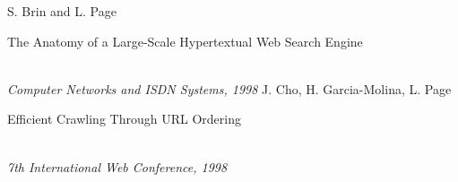 \documentclass[9pt]{beamer}
\begin{document}
\begin{frame}
  \begin{thebibliography}{1}
      S. Brin and L. Page\\
      \begin{bf} The Anatomy of a Large-Scale Hypertextual Web Search Engine \end{bf}\\
      \emph{Computer Networks and ISDN Systems, 1998}
      J. Cho, H. Garcia-Molina, L. Page\\
      \begin{bf} Efficient Crawling Through URL Ordering \end{bf}\\
      \emph{7th International Web Conference, 1998}
  \end{thebibliography}
\end{frame}
\end{document}
